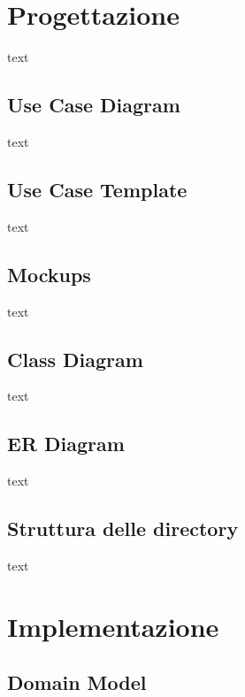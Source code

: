 \documentclass[11pt]{article}
\begin{document}
    \section{Progettazione} \label{sec:progettazione}

        text

        \subsection{Use Case Diagram} \label{subsec:use-case-diagram}

            text

        \subsection{Use Case Template} \label{subsec:use-case-template}

            text

        \subsection{Mockups} \label{subsec:mockups}

            text

        \subsection{Class Diagram} \label{subsec:class-diagram}

            text

        \subsection{ER Diagram} \label{subsec:er-diagram}

            text

        \subsection{Struttura delle directory} \label{subsec:struttura-delle-directory}

            text

    \section{Implementazione} \label{sec:implementazione}

        \subsection{Domain Model} \label{subsec:domain-model}
\end{document}
